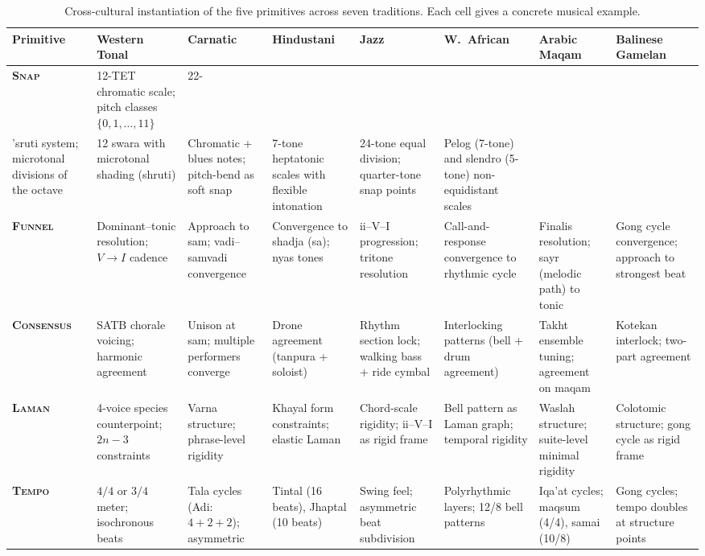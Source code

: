 \documentclass[cmj]{article}
\newcommand{\SNAP}{\textsc{Snap}}
\newcommand{\FUNNEL}{\textsc{Funnel}}
\newcommand{\CONSENSUS}{\textsc{Consensus}}
\newcommand{\LAMAN}{\textsc{Laman}}
\newcommand{\TEMPO}{\textsc{Tempo}}
\begin{document}
\begin{table}
\centering
\caption{Cross-cultural instantiation of the five primitives across seven
traditions. Each cell gives a concrete musical example.}
\label{tab:universal}
\small
\begin{tabular}{@{}l p{3.1cm} p{3.1cm} p{3.1cm} p{3.1cm} p{3.1cm} p{3.1cm} p{3.1cm}@{}}
\toprule
\textbf{Primitive} & \textbf{Western Tonal} & \textbf{Carnatic} & \textbf{Hindustani} & \textbf{Jazz} & \textbf{W.\ African} & \textbf{Arabic Maqam} & \textbf{Balinese Gamelan} \\
\midrule
\textbf{\SNAP{}} &
12-TET chromatic scale; pitch classes $\{0, 1, \ldots, 11\}$ &
22-\\'{s}ruti system; microtonal divisions of the octave &
12 swara with microtonal shading (shruti) &
Chromatic + blues notes; pitch-bend as soft snap &
7-tone heptatonic scales with flexible intonation &
24-tone equal division; quarter-tone snap points &
Pelog (7-tone) and slendro (5-tone) non-equidistant scales \\
\midrule
\textbf{\FUNNEL{}} &
Dominant--tonic resolution; $V \to I$ cadence &
Approach to sam; vadi--samvadi convergence &
Convergence to shadja (sa); nyas tones &
ii--V--I progression; tritone resolution &
Call-and-response convergence to rhythmic cycle &
Finalis resolution; sayr (melodic path) to tonic &
Gong cycle convergence; approach to strongest beat \\
\midrule
\textbf{\CONSENSUS{}} &
SATB chorale voicing; harmonic agreement &
Unison at sam; multiple performers converge &
Drone agreement (tanpura + soloist) &
Rhythm section lock; walking bass + ride cymbal &
Interlocking patterns (bell + drum agreement) &
Takht ensemble tuning; agreement on maqam &
Kotekan interlock; two-part agreement \\
\midrule
\textbf{\LAMAN{}} &
4-voice species counterpoint; $2n - 3$ constraints &
Varna structure; phrase-level rigidity &
Khayal form constraints; elastic Laman &
Chord-scale rigidity; ii--V--I as rigid frame &
Bell pattern as Laman graph; temporal rigidity &
Waslah structure; suite-level minimal rigidity &
Colotomic structure; gong cycle as rigid frame \\
\midrule
\textbf{\TEMPO{}} &
$4/4$ or $3/4$ meter; isochronous beats &
Tala cycles (Adi: $4{+}2{+}2$); asymmetric &
Tintal (16 beats), Jhaptal (10 beats) &
Swing feel; asymmetric beat subdivision &
Polyrhythmic layers; 12/8 bell patterns &
Iqa'at cycles; maqsum (4/4), samai (10/8) &
Gong cycles; tempo doubles at structure points \\
\bottomrule
\end{tabular}
\end{table}
\end{document}
